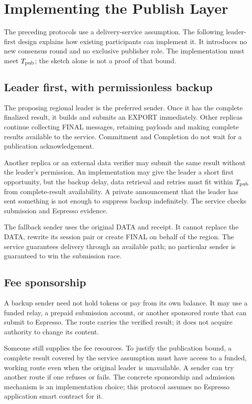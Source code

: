 \documentclass[11pt,a4paper]{article}
\newcounter{protocol}
\begin{document}


\section{Implementing the Publish Layer}
\label{sec:publish-implementation}
The preceding protocols use a delivery-service assumption. The following
leader-first design explains how existing participants can implement it.
It introduces no new consensus round and no exclusive publisher role.
The implementation must meet $T_{\rm pub}$; the sketch alone is not a
proof of that bound.

\subsection{Leader first, with permissionless backup}
The proposing regional leader is the preferred sender. Once it has the
complete finalized result, it builds and submits an EXPORT immediately.
Other replicas continue collecting FINAL messages, retaining payloads and
making complete results available to the service. Commitment and
Completion do not wait for a publication acknowledgement.

Another replica or an external data verifier may submit the same result
without the leader's permission. An implementation may give the leader a
short first opportunity, but the backup delay, data retrieval and retries
must fit within $T_{\rm pub}$ from complete-result availability. A private
announcement that the leader has sent something is not enough to suppress
backup indefinitely. The service checks submission and Espresso evidence.

The fallback sender uses the original DATA and receipt. It cannot replace
the DATA, rewrite its session pair or create FINAL on behalf of the region.
The service guarantees delivery through an available path; no particular
sender is guaranteed to win the submission race.

\subsection{Fee sponsorship}
A backup sender need not hold tokens or pay from its own balance. It may
use a funded relay, a prepaid submission account, or another sponsored
route that can submit to Espresso. The route carries the verified result;
it does not acquire authority to change its content.

Someone still supplies the fee resources. To justify the publication
bound, a complete result covered by the service assumption must have access to a funded,
working route even when the original leader is unavailable. A sender can
try another route if one refuses or fails. The concrete sponsorship and
admission mechanism is an implementation choice; this protocol assumes
no Espresso application smart contract for it.
\end{document}
